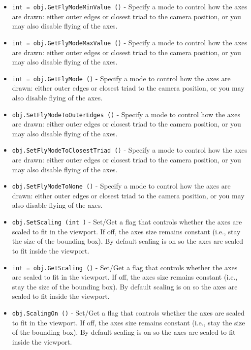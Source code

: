 \begin{itemize}
\item  \verb|int = obj.GetFlyModeMinValue ()| -  Specify a mode to control how the axes are drawn: either outer edges
 or closest triad to the camera position, or you may also disable flying 
 of the axes.

\item  \verb|int = obj.GetFlyModeMaxValue ()| -  Specify a mode to control how the axes are drawn: either outer edges
 or closest triad to the camera position, or you may also disable flying 
 of the axes.

\item  \verb|int = obj.GetFlyMode ()| -  Specify a mode to control how the axes are drawn: either outer edges
 or closest triad to the camera position, or you may also disable flying 
 of the axes.

\item  \verb|obj.SetFlyModeToOuterEdges ()| -  Specify a mode to control how the axes are drawn: either outer edges
 or closest triad to the camera position, or you may also disable flying 
 of the axes.

\item  \verb|obj.SetFlyModeToClosestTriad ()| -  Specify a mode to control how the axes are drawn: either outer edges
 or closest triad to the camera position, or you may also disable flying 
 of the axes.

\item  \verb|obj.SetFlyModeToNone ()| -  Specify a mode to control how the axes are drawn: either outer edges
 or closest triad to the camera position, or you may also disable flying 
 of the axes.

\item  \verb|obj.SetScaling (int )| -  Set/Get a flag that controls whether the axes are scaled to fit in
 the viewport. If off, the axes size remains constant (i.e., stay the
 size of the bounding box). By default scaling is on so the axes are
 scaled to fit inside the viewport.

\item  \verb|int = obj.GetScaling ()| -  Set/Get a flag that controls whether the axes are scaled to fit in
 the viewport. If off, the axes size remains constant (i.e., stay the
 size of the bounding box). By default scaling is on so the axes are
 scaled to fit inside the viewport.

\item  \verb|obj.ScalingOn ()| -  Set/Get a flag that controls whether the axes are scaled to fit in
 the viewport. If off, the axes size remains constant (i.e., stay the
 size of the bounding box). By default scaling is on so the axes are
 scaled to fit inside the viewport.


\end{itemize}
